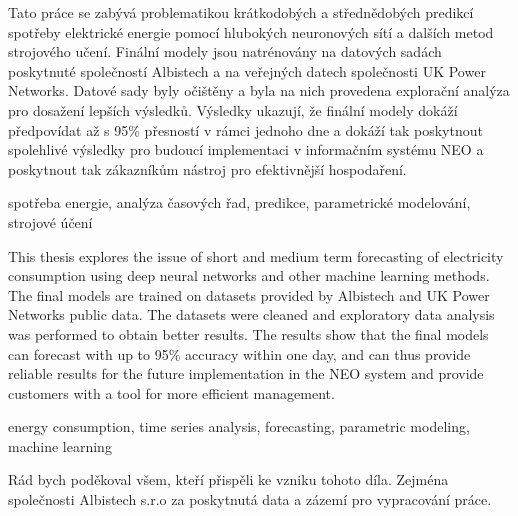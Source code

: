 \documentclass[FM,BP,fonts]{tulthesis}
\begin{document}

\begin{abstractCZ}
Tato práce se zabývá problematikou krátkodobých a střednědobých predikcí spotřeby elektrické energie pomocí hlubokých neuronových sítí a dalších metod strojového učení.  
Finální modely jsou natrénovány na datových sadách poskytnuté společností Albistech a na veřejných datech společnosti UK Power Networks. Datové sady byly očištěny a byla na nich provedena explorační analýza pro dosažení lepších výsledků.
Výsledky ukazují, že finální modely dokáží předpovídat až s 95\% přesností v rámci jednoho dne a dokáží tak poskytnout spolehlivé výsledky pro budoucí implementaci v informačním systému NEO a poskytnout tak zákazníkům nástroj pro efektivnější hospodaření.
\end{abstractCZ}

\begin{keywordsCZ}
spotřeba energie, analýza časových řad, predikce, parametrické modelování, strojové účení

\end{keywordsCZ}

\vspace{2cm}

\begin{abstractEN}
This thesis explores the issue of short and medium term forecasting of electricity consumption using deep neural networks and other machine learning methods.
The final models are trained on datasets provided by Albistech and UK Power Networks public data. The datasets were cleaned and exploratory data analysis was performed to obtain better results.
The results show that the final models can forecast with up to 95\% accuracy within one day, and can thus provide reliable results for the future implementation in the NEO system and provide customers with a tool for more efficient management.
\end{abstractEN}

\begin{keywordsEN}
energy consumption, time series analysis, forecasting, parametric modeling, machine learning
\end{keywordsEN}

\clearpage

\begin{acknowledgement}
Rád bych poděkoval všem, kteří přispěli ke vzniku tohoto díla. Zejména společnosti Albistech s.r.o za poskytnutá data a zázemí pro vypracování práce.
\end{acknowledgement}
\end{document}
